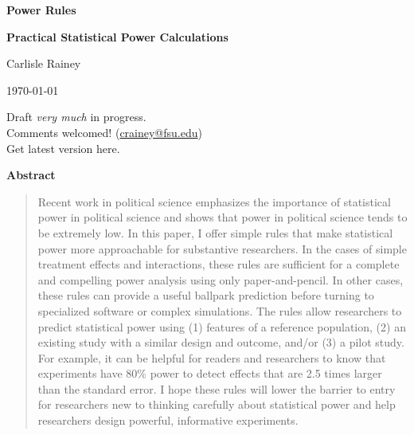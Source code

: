 \documentclass[12pt]{article}
\begin{document}
\begin{center}

{\huge \textbf{Power Rules}
}

\vspace{0.4cm}


{\Large\textbf{Practical Statistical Power Calculations}}



\vspace{1cm}

Carlisle Rainey

\vspace{1cm}
\today 
\vspace{5mm}

Draft \textit{very much} in progress. \\
Comments welcomed! (\href{mailto:crainey@fsu.edu}{crainey@fsu.edu}) \\\vspace{2mm}
Get latest version here.
\end{center}

\vspace{5mm}

{\centerline{\textbf{Abstract}}}
\begin{quote}\noindent
Recent work in political science emphasizes the importance of statistical power in political science and shows that power in political science tends to be extremely low. 
In this paper, I offer simple rules that make statistical power more approachable for substantive researchers. 
In the cases of simple treatment effects and interactions, these rules are sufficient for a complete and compelling power analysis using only paper-and-pencil. 
In other cases, these rules can provide a useful ballpark prediction before turning to specialized software or complex simulations. 
The rules allow researchers to predict statistical power using (1) features of a reference population, (2) an existing study with a similar design and outcome, and/or (3) a pilot study. 
For example, it can be helpful for readers and researchers to know that experiments have 80\% power to detect effects that are 2.5 times larger than the standard error. 
I hope these rules will lower the barrier to entry for researchers new to thinking carefully about statistical power and help researchers design powerful, informative experiments.
\end{quote}
\end{document}
